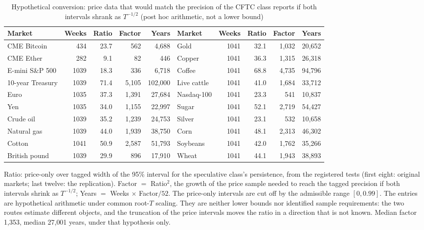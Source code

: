 \documentclass[12pt]{article}
\theoremstyle{definition}
\theoremstyle{remark}
\begin{document}
\begin{table}[!htbp]\centering\footnotesize
\begin{threeparttable}
\caption{Hypothetical conversion: price data that would match the precision of the CFTC class reports if both intervals shrank as $T^{-1/2}$ (post hoc arithmetic, not a lower bound)}\label{tab:dataequiv}
\setlength{\tabcolsep}{2.5pt}
\begin{tabular}{lrrrr@{\hspace{10pt}}lrrrr}
\toprule
Market & Weeks & Ratio & Factor & Years & Market & Weeks & Ratio & Factor & Years\\
\midrule
CME Bitcoin & 434 & 23.7 & 562 & 4{,}688 & Gold & 1041 & 32.1 & 1{,}032 & 20{,}652\\
CME Ether & 282 & 9.1 & 82 & 446 & Copper & 1041 & 36.3 & 1{,}315 & 26{,}318\\
E-mini S\&P 500 & 1039 & 18.3 & 336 & 6{,}718 & Coffee & 1041 & 68.8 & 4{,}735 & 94{,}796\\
10-year Treasury & 1039 & 71.4 & 5{,}105 & 102{,}000 & Live cattle & 1041 & 41.0 & 1{,}684 & 33{,}712\\
Euro & 1035 & 37.3 & 1{,}391 & 27{,}684 & Nasdaq-100 & 1041 & 23.3 & 541 & 10{,}837\\
Yen & 1035 & 34.0 & 1{,}155 & 22{,}997 & Sugar & 1041 & 52.1 & 2{,}719 & 54{,}427\\
Crude oil & 1039 & 35.2 & 1{,}239 & 24{,}753 & Silver & 1041 & 23.1 & 532 & 10{,}658\\
Natural gas & 1039 & 44.0 & 1{,}939 & 38{,}750 & Corn & 1041 & 48.1 & 2{,}313 & 46{,}302\\
Cotton & 1041 & 50.9 & 2{,}587 & 51{,}793 & Soybeans & 1041 & 42.0 & 1{,}762 & 35{,}266\\
British pound & 1039 & 29.9 & 896 & 17{,}910 & Wheat & 1041 & 44.1 & 1{,}943 & 38{,}893\\
\bottomrule
\end{tabular}
\begin{tablenotes}\footnotesize\item Ratio: price-only over tagged width of the 95\% interval for the speculative class's persistence, from the registered tests (first eight: original markets; last twelve: the replication). Factor $=$ Ratio$^2$, the growth of the price sample needed to reach the tagged precision if both intervals shrink as $T^{-1/2}$; Years $=$ Weeks $\times$ Factor$/52$. The price-only intervals are cut off by the admissible range $[0,0.99]$. The entries are hypothetical arithmetic under common root-$T$ scaling. They are neither lower bounds nor identified sample requirements: the two routes estimate different objects, and the truncation of the price intervals moves the ratio in a direction that is not known. Median factor 1{,}353, median 27{,}001 years, under that hypothesis only.\end{tablenotes}
\end{threeparttable}
\end{table}
\end{document}

